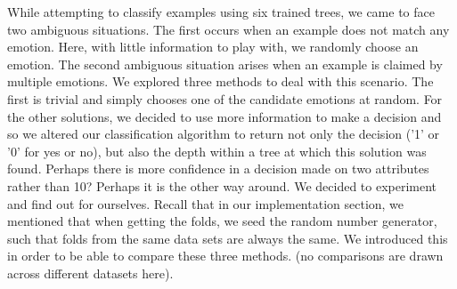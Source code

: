 While attempting to classify examples using six trained trees, we came to face two ambiguous situations.
The first occurs when an example does not match any emotion.
Here, with little information to play with, we randomly choose an emotion.
The second ambiguous situation arises when an example is claimed by multiple emotions.
We explored three methods to deal with this scenario.
The first is trivial and simply chooses one of the candidate emotions at random.
For the other solutions, we decided to use more information to make a decision and so we altered our classification algorithm
to return not only the decision ('1' or '0' for yes or no), but also the depth within a tree at which this solution was found.
Perhaps there is more confidence in a decision made on two attributes rather than 10? Perhaps it is the other way around.
We decided to experiment and find out for ourselves. Recall that in our implementation section, we mentioned that when getting
the folds, we seed the random number generator, such that folds from the same data sets are always the same. We introduced this
in order to be able to compare these three methods. (no comparisons are drawn across different datasets here).\\

